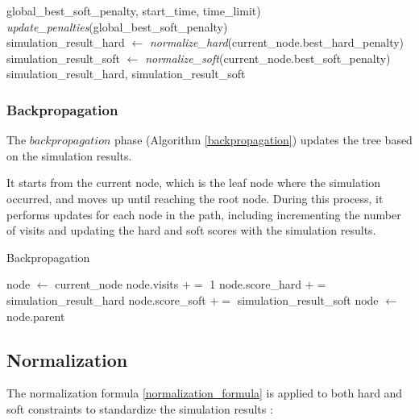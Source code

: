 \begin{algorithm}
\begin{algorithmic}[1]
            \Statex \hspace{3cm} global\_best\_soft\_penalty, start\_time, time\_limit)
            \State \textit{update\_penalties}(global\_best\_soft\_penalty)
        \EndIf
    \EndIf
    \\
    \State simulation\_result\_hard $\gets$ \textit{normalize\_hard}(current\_node.best\_hard\_penalty)
    \State simulation\_result\_soft $\gets$ \textit{normalize\_soft}(current\_node.best\_soft\_penalty)
    \\
    \State \Return simulation\_result\_hard, simulation\_result\_soft
\EndFunction
\end{algorithmic}
\end{algorithm}

\subsubsection{Backpropagation}

The \(backpropagation\) phase (Algorithm \ref{backpropagation}) updates the tree based on the simulation results. 

It starts from the current node, which is the leaf node where the simulation occurred, and moves up until reaching the root node. During this process, it performs updates for each node in the path, including incrementing the number of visits and updating the hard and soft scores with the simulation results. 

\begin{algorithm}
\caption{Backpropagation}\label{backpropagation}
\begin{algorithmic}[1]
    \State node $\gets$ current\_node
        \State node.visits $+=$ 1
        \State node.score\_hard $+=$ simulation\_result\_hard
        \State node.score\_soft $+=$ simulation\_result\_soft
        \State node $\gets$ node.parent
    \EndWhile
\EndFunction
\end{algorithmic}
\end{algorithm}

\subsection{Normalization}

The normalization formula \ref{normalization_formula} is applied to both hard and soft constraints to standardize the simulation results \cite{pedroso_tree_2015}:

